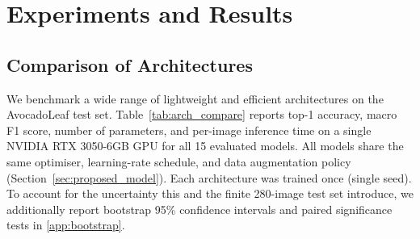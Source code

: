 \section{Experiments and Results}
\label{sec:experiments}

\subsection{Comparison of Architectures}
\label{subsec:arch_compare}

We benchmark a wide range of lightweight and efficient architectures on the AvocadoLeaf test set. Table~\ref{tab:arch_compare} reports top-1 accuracy, macro F1 score, number of parameters, and per-image inference time on a single NVIDIA RTX 3050-6GB GPU for all 15 evaluated models. All models share the same optimiser, learning-rate schedule, and data augmentation policy (Section~\ref{sec:proposed_model}). Each architecture was trained once (single seed). To account for the uncertainty this and the finite 280-image test set introduce, we additionally report bootstrap 95\% confidence intervals and paired significance tests in \ref{app:bootstrap}.

